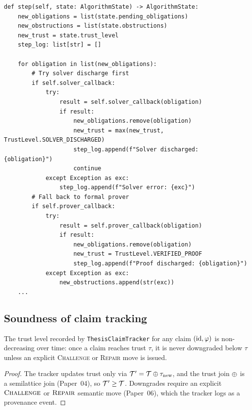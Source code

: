 \documentclass[11pt]{article}
\begin{document}
\begin{lstlisting}[style=jugeo-python,
    caption={ClaimVerificationAlgorithm.step (simplified)},
    label={lst:cva-step}]
def step(self, state: AlgorithmState) -> AlgorithmState:
    new_obligations = list(state.pending_obligations)
    new_obstructions = list(state.obstructions)
    new_trust = state.trust_level
    step_log: list[str] = []

    for obligation in list(new_obligations):
        # Try solver discharge first
        if self.solver_callback:
            try:
                result = self.solver_callback(obligation)
                if result:
                    new_obligations.remove(obligation)
                    new_trust = max(new_trust, TrustLevel.SOLVER_DISCHARGED)
                    step_log.append(f"Solver discharged: {obligation}")
                    continue
            except Exception as exc:
                step_log.append(f"Solver error: {exc}")
        # Fall back to formal prover
        if self.prover_callback:
            try:
                result = self.prover_callback(obligation)
                if result:
                    new_obligations.remove(obligation)
                    new_trust = TrustLevel.VERIFIED_PROOF
                    step_log.append(f"Proof discharged: {obligation}")
            except Exception as exc:
                new_obstructions.append(str(exc))
    ...
\end{lstlisting}

\subsection{Soundness of claim tracking}

\begin{proposition}\label{prop:tracker-mono}
The trust level recorded by \texttt{ThesisClaimTracker} for any claim
$(\mathrm{id}, \varphi)$ is non-decreasing over time: once a claim
reaches trust $\tau$, it is never downgraded below $\tau$ unless an
explicit \textsc{Challenge} or \textsc{Repair} move is issued.
\end{proposition}
\begin{proof}
The tracker updates trust only via $\mathcal{T}' = \mathcal{T} \oplus \tau_{\mathrm{new}}$,
and the trust join $\oplus$ is a semilattice join (Paper~04), so
$\mathcal{T}' \geq \mathcal{T}$.  Downgrades require an explicit
$\textsc{Challenge}$ or $\textsc{Repair}$ semantic move (Paper~06), which the tracker
logs as a provenance event.
\end{proof}
\end{document}
